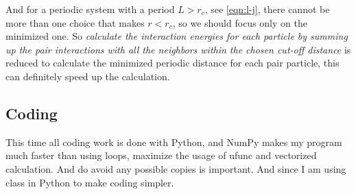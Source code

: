 \documentclass[UTF8,a4paper,no-math]{article}
\begin{document}
\begin{enumerate}
	      And for a periodic system with a period $L > r_c$, see \eqref{eqn:l-j}, there cannot be more than one choice that makes $r < r_c$, so we should focus only on the minimized one. So
	      \textit{calculate the interaction energies for each particle by summing up the pair interactions with all the neighbors within the chosen cut-off distance} is reduced to calculate the minimized periodic
	      distance for each pair particle, this can definitely speed up the calculation.
\end{enumerate}
\subsection{Coding}
This time all coding work is done with Python, and NumPy makes my program much faster than using loops, maximize the usage of ufunc and vectorized calculation. And do avoid any possible copies is important.
And since I am using class in Python to make coding simpler.
\end{document}
